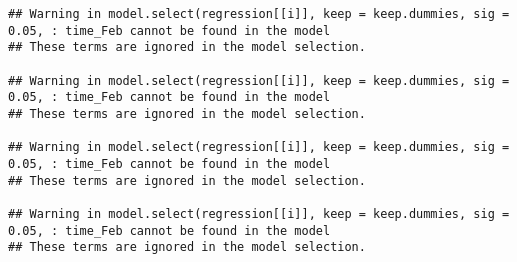 \documentclass[
]{article}
\newenvironment{Shaded}{\begin{snugshade}}{\end{snugshade}}
\newcommand{\AttributeTok}[1]{\textcolor[rgb]{0.77,0.63,0.00}{#1}}
\newcommand{\CommentTok}[1]{\textcolor[rgb]{0.56,0.35,0.01}{\textit{#1}}}
\newcommand{\ControlFlowTok}[1]{\textcolor[rgb]{0.13,0.29,0.53}{\textbf{#1}}}
\newcommand{\DecValTok}[1]{\textcolor[rgb]{0.00,0.00,0.81}{#1}}
\newcommand{\FunctionTok}[1]{\textcolor[rgb]{0.00,0.00,0.00}{#1}}
\newcommand{\NormalTok}[1]{#1}
\newcommand{\OtherTok}[1]{\textcolor[rgb]{0.56,0.35,0.01}{#1}}
\newcommand{\SpecialCharTok}[1]{\textcolor[rgb]{0.00,0.00,0.00}{#1}}
\newcommand{\StringTok}[1]{\textcolor[rgb]{0.31,0.60,0.02}{#1}}
\begin{document}
\begin{verbatim}
## Warning in model.select(regression[[i]], keep = keep.dummies, sig = 0.05, : time_Feb cannot be found in the model 
## These terms are ignored in the model selection.

## Warning in model.select(regression[[i]], keep = keep.dummies, sig = 0.05, : time_Feb cannot be found in the model 
## These terms are ignored in the model selection.

## Warning in model.select(regression[[i]], keep = keep.dummies, sig = 0.05, : time_Feb cannot be found in the model 
## These terms are ignored in the model selection.

## Warning in model.select(regression[[i]], keep = keep.dummies, sig = 0.05, : time_Feb cannot be found in the model 
## These terms are ignored in the model selection.
\end{verbatim}

\begin{Shaded}
\end{Shaded}
\end{document}
